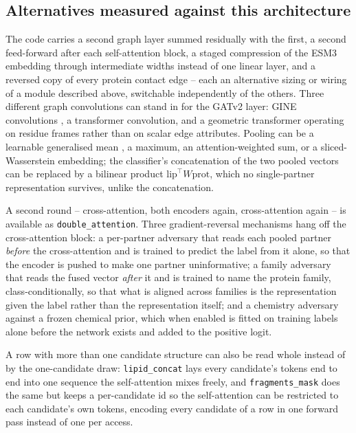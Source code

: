 \subsection{Alternatives measured against this architecture}

The code carries a second graph layer summed residually with the first, a second
feed-forward after each self-attention block, a staged compression of the ESM3 embedding
through intermediate widths instead of one linear layer, and a reversed copy of every
protein contact edge -- each an alternative sizing or wiring of a module described above,
switchable independently of the others. Three different graph convolutions can stand in
for the GATv2 layer: GINE convolutions \cite{gine}, a transformer convolution, and a
geometric transformer operating on residue frames rather than on scalar edge attributes.
Pooling can be a learnable generalised mean \cite{gem}, a maximum, an attention-weighted
sum, or a sliced-Wasserstein embedding; the classifier's concatenation of the two pooled
vectors can be replaced by a bilinear product $\mathrm{lip}^{\top} W \mathrm{prot}$, which
no single-partner representation survives, unlike the concatenation.

A second round -- cross-attention, both encoders again, cross-attention again -- is
available as \texttt{double\_attention}. Three gradient-reversal mechanisms
\cite{ganin} hang off the cross-attention block: a per-partner adversary that reads each
pooled partner \emph{before} the cross-attention and is trained to predict the label from
it alone, so that the encoder is pushed to make one partner uninformative; a family
adversary that reads the fused vector \emph{after} it and is trained to name the protein
family, class-conditionally, so that what is aligned across families is the
representation given the label rather than the representation itself; and a chemistry
adversary against a frozen chemical prior, which when enabled is fitted on training
labels alone before the network exists and added to the positive logit.

A row with more than one candidate structure can also be read whole instead of by the
one-candidate draw: \texttt{lipid\_concat} lays every candidate's tokens end to end into
one sequence the self-attention mixes freely, and \texttt{fragments\_mask} does the same
but keeps a per-candidate id so the self-attention can be restricted to each candidate's
own tokens, encoding every candidate of a row in one forward pass instead of one per
access.


